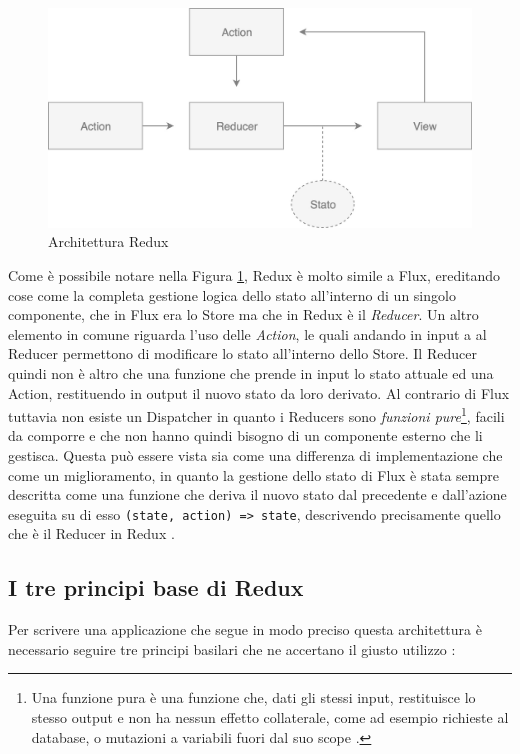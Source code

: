 \begin{figure}[h]
\centering
\vspace*{0.5cm} 
\includegraphics[width=11.5cm]{./images/ReduxWorkflow}
\caption{Architettura Redux}
\label{ReduxWorkflow}
\vspace*{0.5cm} 
\end{figure}

Come è possibile notare nella Figura \ref{ReduxWorkflow}, Redux è molto simile a Flux, ereditando cose come la completa gestione logica dello stato all'interno di un singolo componente, che in Flux era lo Store ma che in Redux è il \textit{Reducer}. Un altro elemento in comune riguarda l'uso delle \textit{Action}, le quali andando in input a al Reducer permettono di modificare lo stato all'interno dello Store. Il Reducer quindi non è altro che una funzione che prende in input lo stato attuale ed una Action, restituendo in output il nuovo stato da loro derivato.
Al contrario di Flux tuttavia non esiste un Dispatcher in quanto i Reducers sono \textit{funzioni pure}\footnote{Una funzione pura è una funzione che, dati gli stessi input, restituisce lo stesso output e non ha nessun effetto collaterale, come ad esempio richieste al database, o mutazioni a variabili fuori dal suo scope \cite{FranklinOnPureFunctions}.}, facili da comporre e che non hanno quindi bisogno di un componente esterno che li gestisca. Questa può essere vista sia come una differenza di implementazione che come un miglioramento, in quanto la gestione dello stato di Flux è stata sempre descritta come una funzione che deriva il nuovo stato dal precedente e dall'azione eseguita su di esso \texttt{(state, action) => state}, descrivendo precisamente quello che è il Reducer in Redux \cite{ReduxDocumentation}.

\subsection{I tre principi base di Redux}
Per scrivere una applicazione che segue in modo preciso questa architettura è necessario seguire tre principi basilari che ne accertano il giusto utilizzo \cite{ReduxDocumentation}:


